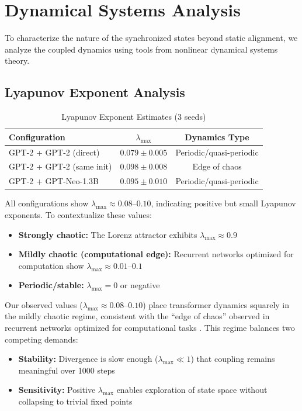 \documentclass[10pt]{article} %
\theoremstyle{plain}
\theoremstyle{definition}
\theoremstyle{remark}
\begin{document}
\section{Dynamical Systems Analysis}

To characterize the nature of the synchronized states beyond static alignment, we analyze the coupled dynamics using tools from nonlinear dynamical systems theory.

\subsection{Lyapunov Exponent Analysis}

\begin{table}[htbp]
\centering
\caption{Lyapunov Exponent Estimates (3 seeds)}
\label{tab:lyapunov}
\small
\begin{tabular}{lcc}
\toprule
\textbf{Configuration} & \textbf{$\lambda_{\max}$} & \textbf{Dynamics Type} \\
\midrule
GPT-2 + GPT-2 (direct) & $0.079 \pm 0.005$ & Periodic/quasi-periodic \\
GPT-2 + GPT-2 (same init) & $0.098 \pm 0.008$ & Edge of chaos \\
GPT-2 + GPT-Neo-1.3B & $0.095 \pm 0.010$ & Periodic/quasi-periodic \\
\bottomrule
\end{tabular}
\end{table}

All configurations show $\lambda_{\max} \approx 0.08$--$0.10$, indicating positive but small Lyapunov exponents. To contextualize these values:
\begin{itemize}
    \item \textbf{Strongly chaotic:} The Lorenz attractor exhibits $\lambda_{\max} \approx 0.9$
    \item \textbf{Mildly chaotic (computational edge):} Recurrent networks optimized for computation show $\lambda_{\max} \approx 0.01$--$0.1$ \citep{bertschinger2004real}
    \item \textbf{Periodic/stable:} $\lambda_{\max} = 0$ or negative
\end{itemize}

Our observed values ($\lambda_{\max} \approx 0.08$--$0.10$) place transformer dynamics squarely in the mildly chaotic regime, consistent with the ``edge of chaos'' observed in recurrent networks optimized for computational tasks \citep{langton1990computation,bertschinger2004real}. This regime balances two competing demands:
\begin{itemize}
    \item \textbf{Stability:} Divergence is slow enough ($\lambda_{\max} \ll 1$) that coupling remains meaningful over 1000 steps
    \item \textbf{Sensitivity:} Positive $\lambda_{\max}$ enables exploration of state space without collapsing to trivial fixed points
\end{itemize}
\end{document}

